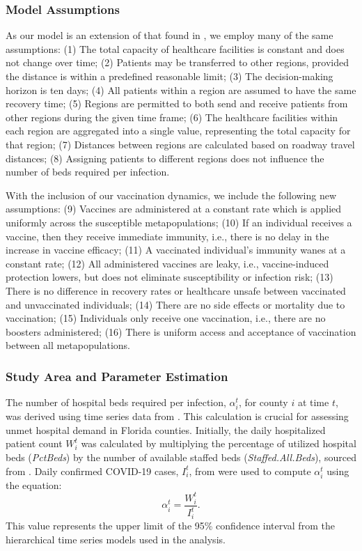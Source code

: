 \documentclass{article}
\begin{document}
\subsubsection{Model Assumptions}
As our model is an extension of that found in \textcite{abazari2024allocation}, we employ many of the same assumptions: (1) The total capacity of healthcare facilities is constant and does not change over time; (2) Patients may be transferred to other regions, provided the distance is within a predefined reasonable limit; (3) The decision-making horizon is ten days; (4) All patients within a region are assumed to have the same recovery time; (5) Regions are permitted to both send and receive patients from other regions during the given time frame; (6) The healthcare facilities within each region are aggregated into a single value, representing the total capacity for that region; (7) Distances between regions are calculated based on roadway travel distances; (8) Assigning patients to different regions does not influence the number of beds required per infection.

With the inclusion of our vaccination dynamics, we include the following new assumptions: (9) Vaccines are administered at a constant rate which is applied uniformly across the susceptible metapopulations; (10) If an individual receives a vaccine, then they receive immediate immunity, i.e., there is no delay in the increase in vaccine efficacy; (11) A vaccinated individual's immunity wanes at a constant rate; (12) All administered vaccines are leaky, i.e., vaccine-induced protection lowers, but does not eliminate susceptibility or infection risk; (13) There is no difference in recovery rates or healthcare unsafe between vaccinated and unvaccinated individuals; (14) There are no side effects or mortality due to vaccination; (15) Individuals only receive one vaccination, i.e., there are no boosters administered; (16) There is uniform access and acceptance of vaccination between all metapopulations. 



\subsubsection{Study Area and Parameter Estimation}
The number of hospital beds required per infection, $\alpha_i^t$, for county $i$ at time $t$, was derived using time series data from \textcite{abazari2024allocation}. This calculation is crucial for assessing unmet hospital demand in Florida counties. Initially, the daily hospitalized patient count $W_i^t$ was calculated by multiplying the percentage of utilized hospital beds (\textit{PctBeds}) by the number of available staffed beds (\textit{Staffed.All.Beds}), sourced from \parencite{covid19pvi2023}. Daily confirmed COVID-19 cases, $I_i^t$, from \parencite{florida_covid19_hub2023} were used to compute $\alpha_i^t$ using the equation:
\[
    \alpha_i^t = \frac{W_i^t}{I_i^t}.
\]
This value represents the upper limit of the 95\% confidence interval from the hierarchical time series models used in the analysis.
 
\end{document}
